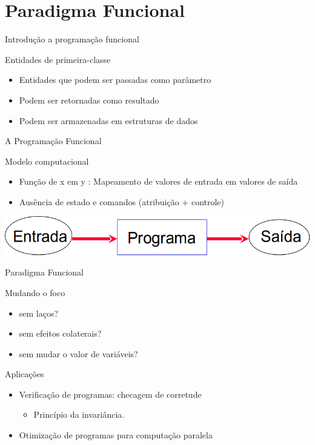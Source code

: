 \section{Paradigma Funcional}
\begin{frame}{Introdução a programação funcional}
	\begin{block}{Entidades de primeira-classe}
	\begin{itemize}
		\item Entidades que podem ser passadas como parâmetro
		\item Podem ser retornadas como resultado
		\item Podem ser armazenadas em estruturas de dados
	\end{itemize}
	\end{block}
\end{frame}
\begin{frame}{A Programação Funcional}
	\begin{block}{Modelo computacional}
		\begin{itemize}
			\item Função de x em y : Mapeamento de valores de entrada em valores de saída
			\item Ausência de estado e comandos (atribuição + controle)
		\end{itemize}		
	\end{block}
	\begin{center}
		\includegraphics[scale=0.3]{modelo_funcional.png}
	\end{center}
\end{frame}
\begin{frame}{Paradigma Funcional}
	\begin{block}{Mudando o foco}
		\begin{itemize}
			\item sem laços?
			\item sem efeitos colaterais?
			\item sem mudar o valor de variáveis?
		\end{itemize}
	\end{block}
	\begin{block}{Aplicações}
		\begin{itemize}
			\item Verificação de programas: checagem de corretude 
				\begin{itemize}
					\item Princípio da invariância. 
				\end{itemize}
			\item Otimização de programas para computação paralela
		\end{itemize}
	\end{block}
\end{frame}
